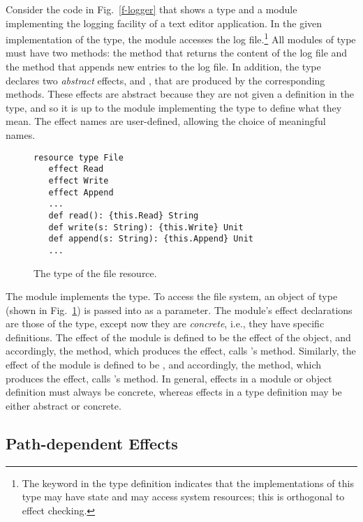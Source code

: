 Consider the code in Fig.~\ref{f-logger} that shows a type and a module implementing the logging facility of a text editor application.  In the given implementation of the  type, the  module accesses the log file.\footnote{The keyword  in the type definition indicates that the implementations of this type may have state and may access system resources; this is orthogonal to effect checking.} All modules of type  must have two methods: the  method that returns the content of the log file and the  method that appends new entries to the log file. In addition, the  type declares two \textit{abstract} effects,  and , that are produced by the corresponding methods. These effects are abstract because they are not given a definition in the  type, and so it is up to the module implementing the  type to define what they mean. The effect names are user-defined, allowing the choice of meaningful names.

\begin{figure}[t]
\begin{lstlisting}
resource type File
   effect Read
   effect Write
   effect Append
   ...
   def read(): {this.Read} String
   def write(s: String): {this.Write} Unit
   def append(s: String): {this.Append} Unit
   ...
\end{lstlisting}
\caption{The type of the file resource.}
\label{f-file}
\end{figure}

The  module implements the  type. To access the file system, an object of type  (shown in Fig.~\ref{f-file}) is passed into  as a parameter. The  module's effect declarations are those of the  type, except now they are \textit{concrete}, i.e., they have specific definitions. The  effect of the  module is defined to be the  effect of the  object, and accordingly, the  method, which produces the  effect, calls 's  method. Similarly, the  effect of the  module is defined to be , and accordingly, the  method, which produces the  effect, calls 's  method. In general, effects in a module or object definition must always be concrete, whereas effects in a type definition may be either abstract or concrete.


\subsection{Path-dependent Effects}

